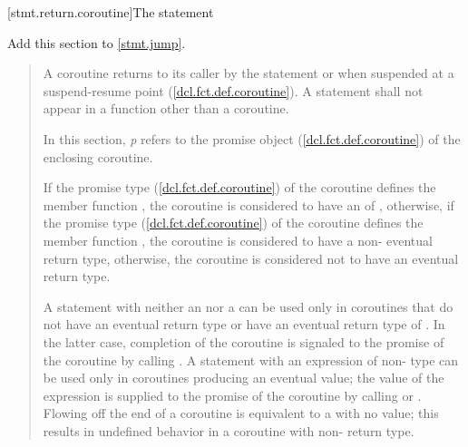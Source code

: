 [stmt.return.coroutine]{The  statement}%

Add this section to \ref{stmt.jump}.

\begin{quote}

\pnum
A coroutine returns to its caller by the  statement
or when suspended at a suspend-resume point (\ref{dcl.fct.def.coroutine}). A  statement shall not appear in a function other than a coroutine.


\pnum
  In this section, \textit{p} refers to the promise object  
  (\ref{dcl.fct.def.coroutine})
  of the enclosing coroutine.
  
\pnum
  If the promise type (\ref{dcl.fct.def.coroutine}) of the coroutine defines the member function , the coroutine is considered to have an  of , otherwise, if the promise type (\ref{dcl.fct.def.coroutine}) of the coroutine defines the member function , the coroutine is considered to have a non- eventual return  type, otherwise, the coroutine is considered not to have an eventual return type.
  
\pnum
A  statement
with neither an  nor a 
can be used only in coroutines
that do not have an eventual return type or have an eventual return type of . In the latter case, completion of the coroutine
is signaled to the promise of the coroutine by calling .
A  statement with an expression of non- type can be used only
in coroutines producing an eventual value; the value of the expression is supplied to the promise of the coroutine by calling 
 or
. Flowing off the end of a coroutine is equivalent to a  with no value; this results in undefined
behavior in a coroutine with non- return type.

%


\end{quote}

